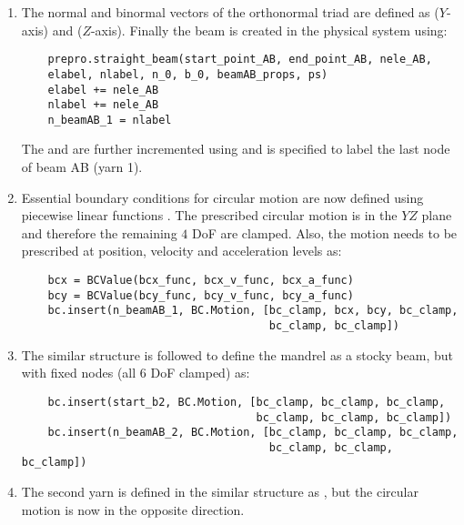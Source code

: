 \begin{enumerate}
    \item The normal and binormal vectors of the orthonormal triad are defined as  ($Y$-axis) and  ($Z$-axis). Finally the beam is created in the physical system using:
    \pythonstyle
    \begin{tcolorbox}\begin{lstlisting}
    prepro.straight_beam(start_point_AB, end_point_AB, nele_AB, 
    elabel, nlabel, n_0, b_0, beamAB_props, ps)
    elabel += nele_AB 
    nlabel += nele_AB 
    n_beamAB_1 = nlabel
    \end{lstlisting}\end{tcolorbox}
        The  and  are further incremented using  and  is specified to label the last node of beam AB (yarn 1).
    \item Essential boundary conditions for circular motion are now defined using piecewise linear functions . The prescribed circular motion is in the $YZ$ plane and therefore the remaining $4$ DoF are clamped. Also, the motion needs to be prescribed at position, velocity and acceleration levels as:
    \pythonstyle
    \begin{tcolorbox}\begin{lstlisting}
    bcx = BCValue(bcx_func, bcx_v_func, bcx_a_func)
    bcy = BCValue(bcy_func, bcy_v_func, bcy_a_func)
    bc.insert(n_beamAB_1, BC.Motion, [bc_clamp, bcx, bcy, bc_clamp, 
                                      bc_clamp, bc_clamp])
    \end{lstlisting}\end{tcolorbox}
    \item The similar structure is followed to define the mandrel as a stocky beam, but with fixed nodes (all $6$ DoF clamped) as:
    \pythonstyle
    \begin{tcolorbox}\begin{lstlisting}
    bc.insert(start_b2, BC.Motion, [bc_clamp, bc_clamp, bc_clamp, 
                                    bc_clamp, bc_clamp, bc_clamp])
    bc.insert(n_beamAB_2, BC.Motion, [bc_clamp, bc_clamp, bc_clamp, 
                                      bc_clamp, bc_clamp, bc_clamp])
    \end{lstlisting}\end{tcolorbox}
    \item The second yarn is defined in the similar structure as , but the circular motion is now in the opposite direction.

\end{enumerate}
